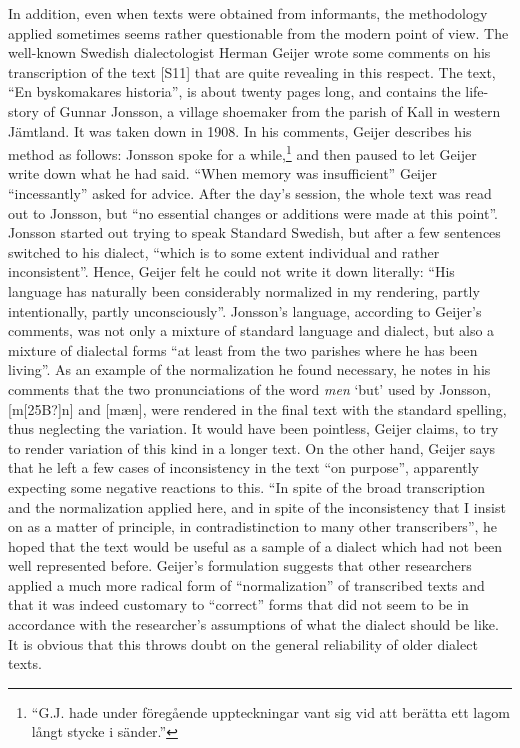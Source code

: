 In addition, even when texts were obtained from informants, the methodology applied sometimes seems rather questionable from the modern point of view. The well-known Swedish dialectologist Herman Geijer wrote some comments on his transcription of the text [S11] that are quite revealing in this respect. The text, “En byskomakares historia”, is about twenty pages long, and contains the life-story of Gunnar Jonsson, a village shoemaker from the parish of Kall in western Jämtland. It was taken down in 1908. In his comments, Geijer describes his method as follows: Jonsson spoke for a while,\footnote{ “G.J. hade under föregående uppteckningar vant sig vid att berätta ett lagom långt stycke i sänder.”} and then paused to let Geijer write down what he had said. “When memory was insufficient” Geijer “incessantly” asked for advice. After the day’s session, the whole text was read out to Jonsson, but “no essential changes or additions were made at this point”. Jonsson started out trying to speak Standard Swedish, but after a few sentences switched to his dialect, “which is to some extent individual and rather inconsistent”. Hence, Geijer felt he could not write it down literally: “His language has naturally been considerably normalized in my rendering, partly intentionally, partly unconsciously”. Jonsson’s language, according to Geijer’s comments, was not only a mixture of standard language and dialect, but also a mixture of dialectal forms “at least from the two parishes where he has been living”. As an example of the normalization he found necessary, he notes in his comments that the two pronunciations of the word \textit{men} ‘but’ used by Jonsson, [m[25B?]n] and [mæn], were rendered in the final text with the standard spelling, thus neglecting the variation. It would have been pointless, Geijer claims, to try to render variation of this kind in a longer text. On the other hand, Geijer says that he left a few cases of inconsistency in the text “on purpose”, apparently expecting some negative reactions to this. “In spite of the broad transcription and the normalization applied here, and in spite of the inconsistency that I insist on as a matter of principle, in contradistinction to many other transcribers”, he hoped that the text would be useful as a sample of a dialect which had not been well represented before. Geijer’s formulation suggests that other researchers applied a much more radical form of “normalization” of transcribed texts and that it was indeed customary to “correct” forms that did not seem to be in accordance with the researcher’s assumptions of what the dialect should be like. It is obvious that this throws doubt on the general reliability of older dialect texts.

